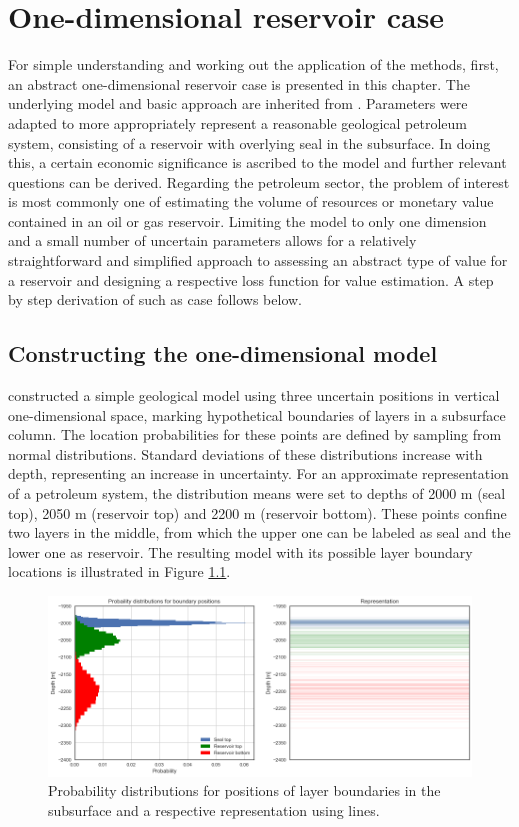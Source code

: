 \chapter{One-dimensional reservoir case}

For simple understanding and working out the application of the methods, first, an abstract one-dimensional reservoir case is presented in this chapter. The underlying model and basic approach are inherited from \citet{delaVarga2016}. Parameters were adapted to more appropriately represent a reasonable geological petroleum system, consisting of a reservoir with overlying seal in the subsurface. In doing this, a certain economic significance is ascribed to the model and further relevant questions can be derived. Regarding the petroleum sector, the problem of interest is most commonly one of estimating the volume of resources or monetary value contained in an oil or gas reservoir. Limiting the model to only one dimension and a small number of uncertain parameters allows for a relatively straightforward and simplified approach to assessing an abstract type of value for a reservoir and designing a respective loss function for value estimation. A step by step derivation of such as case follows below.

	\section{Constructing the one-dimensional model}\label{sec:1D_construction}
	
	\citet{delaVarga2016} constructed a simple geological model using three uncertain positions in vertical one-dimensional space, marking hypothetical boundaries of layers in a subsurface column. The location probabilities for these points are defined by sampling from normal distributions. Standard deviations of these distributions increase with depth, representing an increase in uncertainty. For an approximate representation of a petroleum system, the distribution means were set to depths of 2000 m (seal top), 2050 m (reservoir top) and 2200 m (reservoir bottom). These points confine two layers in the middle, from which the upper one can be labeled as seal and the lower one as reservoir. The resulting model with its possible layer boundary locations is illustrated in Figure \ref{fig:1D_model}.
	
	\begin{figure}[h]
		\centering
		\includegraphics[width=1\textwidth]{Figures/1D_model.png}
		\caption{Probability distributions for positions of layer boundaries in the subsurface and a respective representation using lines.}\label{fig:1D_model}
	\end{figure}
	
